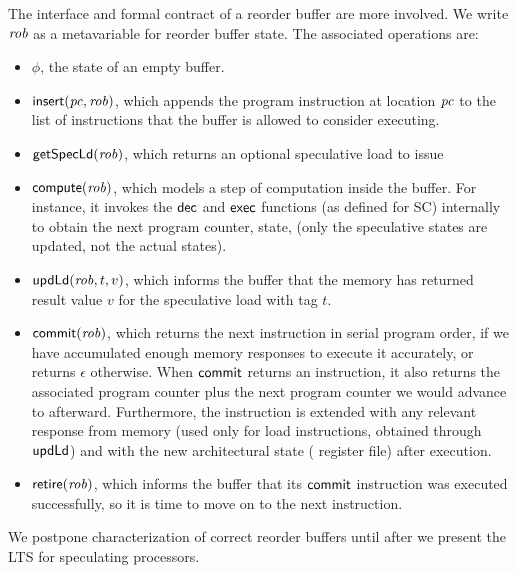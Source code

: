 The interface and formal contract of a reorder buffer are more
involved.  We write $\mathit{rob}$ as a metavariable for reorder buffer
state.  The associated operations are:
\begin{itemize}
\item $\phi$, the state of an empty buffer.
\item $\mathsf{insert}(\mathit{pc}, \mathit{rob})$, which appends the program instruction at location $\mathit{pc}$ to the list of instructions that the buffer is allowed to consider executing.
\item $\mathsf{get}\mathsf{Spec}\mathsf{Ld}(\mathit{rob})$, which returns an optional speculative load to issue
\item $\mathsf{compute}(\mathit{rob})$, which models a
step of computation inside the buffer. For instance, it invokes the $\mathsf{dec}$
and $\mathsf{exec}$ functions (as defined for SC) internally to obtain the next program
counter, state, \etc{} (only the speculative states are updated, not the actual states).
\item $\mathsf{upd}\mathsf{Ld}(\mathit{rob},t,v)$, which informs the buffer that the memory
has returned result value $v$ for the speculative load with tag $t$.
\item $\mathsf{commit}(\mathit{rob})$, which returns the next instruction in serial
program order, if we have accumulated enough memory responses to execute it
accurately, or returns
$\epsilon$ otherwise.  When $\mathsf{commit}$ returns an instruction, it also
returns the associated program counter plus the next program counter
we would advance to afterward.
 Furthermore, the instruction is
extended with any relevant response from memory (used only for load
instructions, obtained through $\mathsf{upd}\mathsf{Ld}$) and with the new architectural state (\eg{} register
file) after execution.
\item $\mathsf{retire}(\mathit{rob})$, which informs the buffer that its $\mathsf{commit}$
instruction was executed successfully, so it is time to move on to the
next instruction.
\end{itemize}

We postpone characterization of correct reorder buffers until after we
present the LTS for speculating processors.

